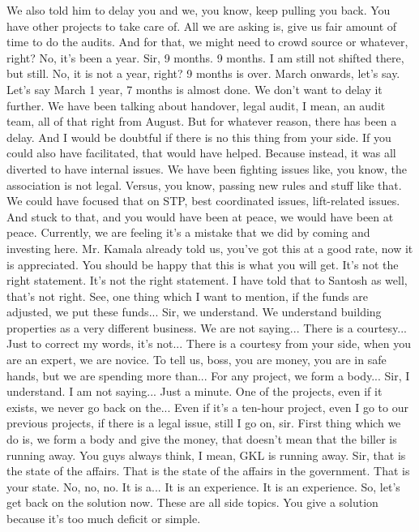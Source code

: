 We also told him to delay you and we, you know, keep pulling you back.
You have other projects to take care of.
All we are asking is, give us fair amount of time to do the audits.
And for that, we might need to crowd source or whatever, right?
No, it's been a year.
Sir, 9 months.
9 months. I am still not shifted there, but still.
No, it is not a year, right? 9 months is over.
March onwards, let's say.
Let's say March 1 year, 7 months is almost done.
We don't want to delay it further. We have been talking about handover, legal audit,
I mean, an audit team, all of that right from August.
But for whatever reason, there has been a delay.
And I would be doubtful if there is no this thing from your side.
If you could also have facilitated, that would have helped.
Because instead, it was all diverted to have internal issues.
We have been fighting issues like, you know, the association is not legal.
Versus, you know, passing new rules and stuff like that.
We could have focused that on STP, best coordinated issues, lift-related issues.
And stuck to that, and you would have been at peace, we would have been at peace.
Currently, we are feeling it's a mistake that we did by coming and investing here.
Mr. Kamala already told us, you've got this at a good rate, now it is appreciated.
You should be happy that this is what you will get.
It's not the right statement.
It's not the right statement.
I have told that to Santosh as well, that's not right.
See, one thing which I want to mention, if the funds are adjusted, we put these funds...
Sir, we understand. We understand building properties as a very different business.
We are not saying...
There is a courtesy...
Just to correct my words, it's not...
There is a courtesy from your side, when you are an expert, we are novice.
To tell us, boss, you are money, you are in safe hands, but we are spending more than...
For any project, we form a body...
Sir, I understand.
I am not saying...
Just a minute. One of the projects, even if it exists, we never go back on the...
Even if it's a ten-hour project, even I go to our previous projects, if there is a legal issue, still I go on, sir.
First thing which we do is, we form a body and give the money, that doesn't mean that the biller is running away.
You guys always think, I mean, GKL is running away.
Sir, that is the state of the affairs.
That is the state of the affairs in the government.
That is your state.
No, no, no. It is a...
It is an experience.
It is an experience.
So, let's get back on the solution now. These are all side topics.
You give a solution because it's too much deficit or simple.

